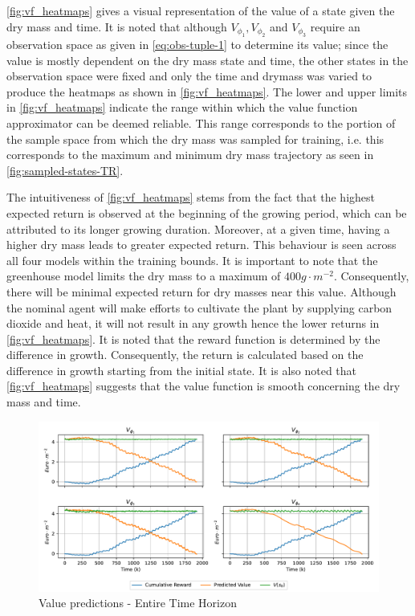 \autoref{fig:vf_heatmaps} gives a visual representation of the value of a state given the dry mass and time. It is noted that although $V_{\phi_1},V_{\phi_2}$ and $V_{\phi_3}$ require an observation space as given in \autoref{eq:obs-tuple-1} to determine its value; since the value is mostly dependent on the dry mass state and time, the other states in the observation space were fixed and only the time and drymass was varied to produce the heatmaps as shown in \autoref{fig:vf_heatmaps}. The lower and upper limits in  \autoref{fig:vf_heatmaps} indicate the range within which the value function approximator can be deemed reliable. This range corresponds to the portion of the sample space from which the dry mass was sampled for training, i.e. this corresponds to the maximum and minimum dry mass trajectory as seen in \autoref{fig:sampled-states-TR}.

The intuitiveness of \autoref{fig:vf_heatmaps} stems from the fact that the highest expected return is observed at the beginning of the growing period, which can be attributed to its longer growing duration.  Moreover, at a given time, having a higher dry mass leads to greater expected return. This behaviour is seen across all four models within the training bounds. It is important to note that the greenhouse model limits the dry mass to a maximum of $400 g \cdot m^{-2}$. Consequently, there will be minimal expected return for dry masses near this value. Although the nominal agent will make efforts to cultivate the plant by supplying carbon dioxide and heat, it will not result in any growth hence the lower returns in \autoref{fig:vf_heatmaps}. It is noted that the reward function is determined by the difference in growth. Consequently, the return is calculated based on the difference in growth starting from the initial state. It is also noted that \autoref{fig:vf_heatmaps} suggests that the value function is smooth concerning the dry mass and time.



\begin{figure}[H]
	\centering
	\includegraphics[width = \textwidth]{figures/vf_time_predictions_long.pdf}
	\caption{Value predictions - Entire Time Horizon}
	\label{fig:tr_predictions_long}
\end{figure}


